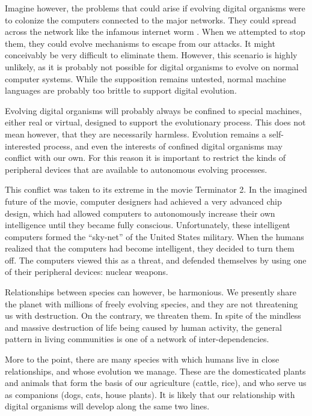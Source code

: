 Imagine however, the problems that could arise if evolving digital
organisms were to colonize the computers connected to the major networks.
They could spread across the network like the infamous internet worm
\cite{Worm1,Worm2,Worm3,Worm4}.  When we attempted to stop them, they
could evolve mechanisms to escape from our attacks.  It might conceivably
be very difficult to eliminate them.  However, this scenario is highly
unlikely, as it is probably not possible for digital organisms to evolve
on normal computer systems.  While the supposition remains untested,
normal machine languages are probably too brittle to support digital
evolution.

Evolving digital organisms will probably always be confined to special
machines, either real or virtual, designed to support the evolutionary
process.  This does not mean however, that they are necessarily harmless.
Evolution remains a self-interested process, and even the interests of
confined digital organisms may conflict with our own.  For this reason
it is important to restrict the kinds of peripheral devices that are
available to autonomous evolving processes. 

This conflict was taken to its extreme in the movie Terminator 2.  In
the imagined future of the movie, computer designers had achieved a very
advanced chip design, which had allowed computers to autonomously increase
their own intelligence until they became fully conscious.  Unfortunately,
these intelligent computers formed the ``sky-net'' of the United States
military.  When the humans realized that the computers had become
intelligent, they decided to turn them off.  The computers viewed this
as a threat, and defended themselves by using one of their peripheral
devices: nuclear weapons.

Relationships between species can however, be harmonious.  We presently
share the planet with millions of freely evolving species, and they are
not threatening us with destruction.  On the contrary, we threaten
them.  In spite of the mindless and massive destruction of life being
caused by human activity, the general pattern in living communities is
one of a network of inter-dependencies. 

More to the point, there are many species with which humans live in
close relationships, and whose evolution we manage.  These are the
domesticated plants and animals that form the basis of our agriculture
(cattle, rice), and who serve us as companions (dogs, cats, house plants).
It is likely that our relationship with digital organisms will develop
along the same two lines.


